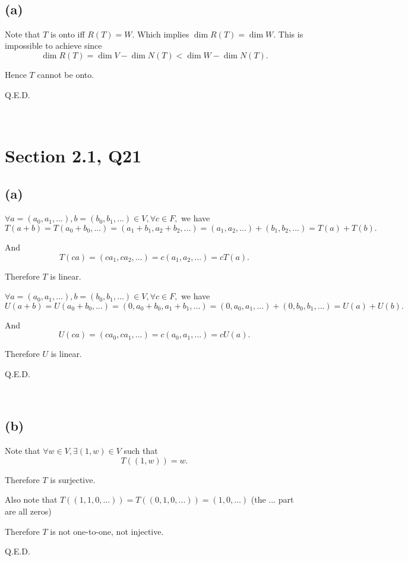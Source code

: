 \documentclass[12pt]{article}%
\begin{document}
~\ 

\subsection{(a)}

Note that $T$ is onto iff $R(T)=W.$ Which implies $\dim{R(T)}=\dim{W}.$ This is impossible to achieve since $$\dim{R(T)}=\dim{V}-\dim{N(T)}<\dim{W}-\dim{N(T)}.$$ 

Hence $T$ cannot be onto. 

Q.E.D. 

~\ 


\section{Section 2.1, Q21}

\subsection{(a)}

$\forall a=(a_0,a_1,...),b=(b_0,b_1,...)\in V, \forall c \in F,$ we have $$T(a+b)=T(a_0+b_0,...)=(a_1+b_1,a_2+b_2,...)=(a_1,a_2,...)+(b_1,b_2,...)=T(a)+T(b).$$

And $$T(ca)=(ca_1,ca_2,...)=c(a_1,a_2,...)=cT(a).$$ 

Therefore $T$ is linear. 

$\forall a=(a_0,a_1,...),b=(b_0,b_1,...)\in V, \forall c \in F,$ we have $$U(a+b)=U(a_0+b_0,...)=(0,a_0+b_0,a_1+b_1,...)=(0,a_0,a_1,...)+(0,b_0,b_1,...)=U(a)+U(b).$$

And $$U(ca)=(ca_0,ca_1,...)=c(a_0,a_1,...)=cU(a).$$ 

Therefore $U$ is linear. 

Q.E.D. 

~\ 

\subsection{(b)}

Note that $\forall w \in V, \exists (1,w)\in V$ such that $$T((1,w))=w.$$ 

Therefore $T$ is surjective. 

Also note that $T((1,1,0,...))=T((0,1,0,...))=(1,0,...)$ (the ... part are all zeros) 

Therefore $T$ is not one-to-one, not injective. 

Q.E.D. 

~\ 
\end{document}
